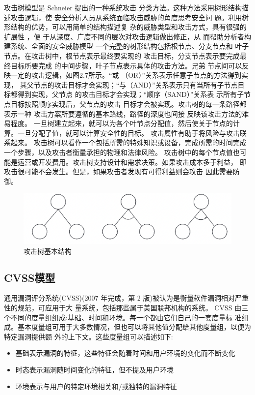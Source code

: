 攻击树模型是 Schneier\cite{schneier1999attack} 提出的一种系统攻击
分类方法。这种方法采用树形结构描述攻击逻辑，使
安全分析人员从系统面临攻击威胁的角度思考安全问
题。利用树形结构的优势，可以用简单的结构描述复
杂的威胁类型和攻击方式，具有很强的扩展性 \cite{tuozhan}
，便
于从深度、广度不同的层次对攻击逻辑做出修正，从
而帮助分析者构建系统、全面的安全威胁模型
一个完整的树形结构包括根节点、分支节点和
叶子节点。在攻击树中，根节点表示最终要实现的
攻击目标，分支节点表示要完成最终目标所要完成
的中间步骤，叶子节点表示具体的攻击方法。兄弟
节点间可以反映一定的攻击逻辑，如图2.7所示。“或
（OR）”关系表示任意子节点的方法得到实现，
其父节点的攻击目标才会实现；“与（AND）”关系表示只有当所有子节点目标都得到实现，父节点
的攻击目标才会实现；“顺序（SAND）”关系表
示所有子节点目标按照顺序实现后，父节点的攻击
目标才会被实现。攻击树的每一条路径都表示一种
攻击方案所要遵循的基本路线，路径的深度也间接
反映该攻击方法的难易程度。
一旦树建立起来，就可以为各个叶节点分配值，然后使关于节点的计算。一旦分配了值，就可以计算安全性的目标。
攻击属性有助于将风险与攻击联系起来。
攻击树可以看作一个包括所需的特殊知识或设备，完成所需的时间完成一个步骤，以及攻击者衡量承担的物理和法律风险。
攻击树中的每个节点值也可能是运营或开发费用。攻击树支持设计和需求决策。如果攻击成本多于利益，
即攻击很可能不会发生。但是，如果攻击者发现有可得利益则会攻击 因此需要防御。

\begin{figure}
    \centering
    \includegraphics[scale=0.6]{resources/img/i8.png}
    \caption{攻击树基本结构}
  \end{figure}

\subsection{CVSS模型}

通用漏洞评分系统(CVSS)(2007 年完成，第 2 版)被认为是衡量软件漏洞相对严重性的规范，可应用于大
量系统，包括那些属于美国联邦机构的系统\cite{mell2007common}。
CVSS 由三个不同的度量组组成:基础、时间和环境。每一个都由它们自己的一套度量标
准组成。基本度量组可用于大多数情况，但也可以将其他值分配给其他度量组，以便为特定漏洞提供额
外的上下文。这些度量组可以描述如下:
\begin{itemize}
    \item  基础表示漏洞的特征，这些特征会随着时间和用户环境的变化而不断变化
    \item  时态表示漏洞随时间变化的特征，但不提及用户环境
    \item  环境表示与用户的特定环境相关和/或独特的漏洞特征
\end{itemize}

